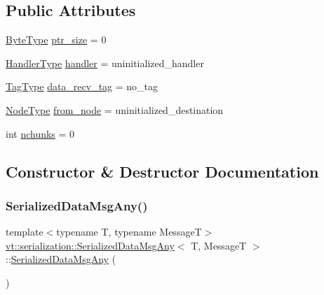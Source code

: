 \subsection*{Public Attributes}
\begin{DoxyCompactItemize}
\item 
\hyperlink{namespacevt_aab8d55968084610ce3b17057981e9300}{Byte\+Type} \hyperlink{structvt_1_1serialization_1_1_serialized_data_msg_any_a756d93ea71e8c3f0ec849f49e19cac98}{ptr\+\_\+size} = 0
\item 
\hyperlink{namespacevt_af64846b57dfcaf104da3ef6967917573}{Handler\+Type} \hyperlink{structvt_1_1serialization_1_1_serialized_data_msg_any_ab6711d57897e86d9ea0c5587fee75eff}{handler} = uninitialized\+\_\+handler
\item 
\hyperlink{namespacevt_a84ab281dae04a52a4b243d6bf62d0e52}{Tag\+Type} \hyperlink{structvt_1_1serialization_1_1_serialized_data_msg_any_af731100b67b3186dbb76fbcff39be3f0}{data\+\_\+recv\+\_\+tag} = no\+\_\+tag
\item 
\hyperlink{namespacevt_a866da9d0efc19c0a1ce79e9e492f47e2}{Node\+Type} \hyperlink{structvt_1_1serialization_1_1_serialized_data_msg_any_aca0ea3cc0037b1d171d610a44a2b8e43}{from\+\_\+node} = uninitialized\+\_\+destination
\item 
int \hyperlink{structvt_1_1serialization_1_1_serialized_data_msg_any_ae38aba68b339489ae16ad23b7c0cccf2}{nchunks} = 0
\end{DoxyCompactItemize}


\subsection{Constructor \& Destructor Documentation}
\mbox{\label{structvt_1_1serialization_1_1_serialized_data_msg_any_abeedde83aef6f281849634198e997a78}} 
\subsubsection{\texorpdfstring{Serialized\+Data\+Msg\+Any()}{SerializedDataMsgAny()}}
{\footnotesize\ttfamily template$<$typename T, typename MessageT$>$ \\
\hyperlink{structvt_1_1serialization_1_1_serialized_data_msg_any}{vt\+::serialization\+::\+Serialized\+Data\+Msg\+Any}$<$ T, MessageT $>$\+::\hyperlink{structvt_1_1serialization_1_1_serialized_data_msg_any}{Serialized\+Data\+Msg\+Any} (\begin{DoxyParamCaption}{ }\end{DoxyParamCaption})\hspace{0.3cm}{\ttfamily [default]}}



